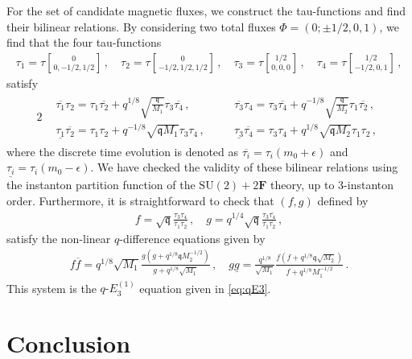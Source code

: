 \documentclass[11pt, a4paper]{article}
\newcommand{\tauftn}[2]{\tau\genfrac[]{0pt}{1}{#1}{#2}}
\theoremstyle{definition}
\begin{document}
For the set of candidate magnetic fluxes, we construct the tau-functions and find their bilinear relations. By considering two total fluxes $ \Phi = (0; \pm 1/2, 0,1) $, we find that the four tau-functions
\begin{align}
    \tau_1 = \tauftn{0}{0,-1/2,1/2} \, , \quad
    \tau_2 = \tauftn{0}{-1/2,1/2,1/2} \, , \quad
    \tau_3 = \tauftn{1/2}{0,0,0} \, , \quad
    \tau_4 = \tauftn{1/2}{-1/2,0,1} \, ,
\end{align}
satisfy
\begin{alignat}{2}
    \begin{aligned}
        &\overline{\tau_1}\tau_2 = \tau_1 \overline{\tau_2} + q^{1/8} \sqrt{\frac{\mathfrak{q}}{M_1}} \tau_3 \overline{\tau_4} \, , \quad
        &&\overline{\tau_3} \tau_4 = \tau_3 \overline{\tau_4} + q^{-1/8} \sqrt{\frac{\mathfrak{q}}{M_2}} \tau_1 \overline{\tau_2} \, , \\
        &\underline{\tau_1} \overline{\tau_2} = \tau_1 \tau_2 + q^{-1/8} \sqrt{\mathfrak{q}M_1} \tau_3 \tau_4 \, , \quad
        &&\underline{\tau_3} \overline{\tau_4} = \tau_3 \tau_4 + q^{1/8} \sqrt{\mathfrak{q}M_2} \tau_1 \tau_2 \, ,
    \end{aligned}
\end{alignat}
where the discrete time evolution is denoted as $ \overline{\tau_i} = \tau_i(m_0+\epsilon) $ and $ \underline{\tau_i} = \tau_i(m_0-\epsilon) $. We have checked the validity of these bilinear relations using the instanton partition function of the $ \mathrm{SU}(2)+2\mathbf{F} $ theory, up to 3-instanton order. Furthermore, it is straightforward to check that $ (f,g) $ defined by
\begin{align}
    f = \sqrt{\mathfrak{q}} \frac{\tau_3 \tau_4}{\tau_1 \tau_2} \, , \quad
    g = q^{1/4} \sqrt{\mathfrak{q}} \frac{\tau_3 \overline{\tau_4}}{\tau_1 \overline{\tau_2}} \, ,
\end{align}
satisfy the non-linear $ q $-difference equations given by
\begin{align}
    f\overline{f} = q^{1/8} \sqrt{M_1} \frac{g(g+q^{1/8} \mathfrak{q} M_2^{-1/2})}{g+q^{1/8} \sqrt{M_1}} \, , \quad
    g\underline{g} = \frac{q^{1/8}}{\sqrt{M_1}} \frac{f(f+q^{1/8} \mathfrak{q}\sqrt{M_2})}{f+q^{1/8} M_1^{-1/2}} \, .
\end{align}
This system is the $ q\text{-}E_3^{(1)} $ equation given in \eqref{eq:qE3}.




\section{Conclusion} \label{sec:conclusion}
\end{document}
